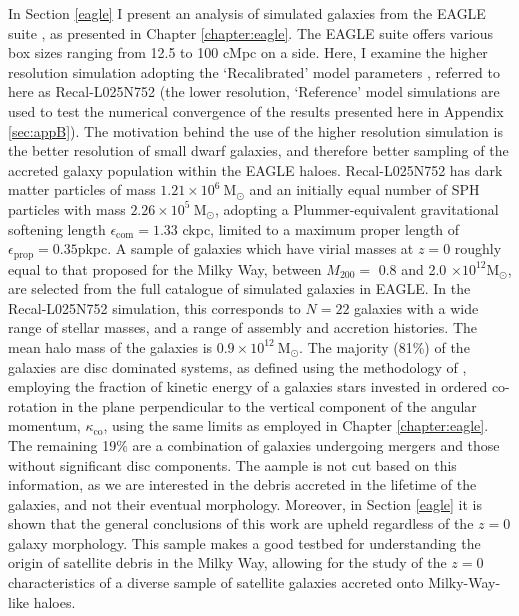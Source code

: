In Section \ref{eagle} I present an analysis of simulated
galaxies from the EAGLE suite
\citep{2015MNRAS.446..521S,2015MNRAS.450.1937C}, as presented in Chapter \ref{chapter:eagle}.  The EAGLE suite offers various box sizes ranging from 12.5 to 100 cMpc on a side. Here, I examine the higher resolution simulation
adopting the `Recalibrated' model parameters
\citep[see][]{2015MNRAS.446..521S}, referred to here as Recal-L025N752
(the lower resolution, `Reference' model simulations are used to test
the numerical convergence of the results presented here in Appendix \ref{sec:appB}).
The motivation behind the use of the higher resolution simulation
is the better resolution of small dwarf galaxies, and therefore
better sampling of the accreted galaxy population within the EAGLE
haloes. Recal-L025N752 has dark matter particles of mass $1.21\times
10^{6}\ \mathrm{M_{\odot}}$ and an initially equal number of SPH
particles with mass $2.26\times 10^{5}\ \mathrm{M_{\odot}}$, adopting
a Plummer-equivalent gravitational softening length
$\epsilon_\mathrm{com}=1.33$ ckpc, limited to a maximum proper
length of $\epsilon_\mathrm{prop}=0.35$pkpc. A sample of
galaxies which have virial masses at $z=0$ roughly equal
to that proposed for the Milky Way, between $M_{200} = $ 0.8 and
2.0 $ \times 10^{12}\mathrm{M_{\odot}}$, are selected from the full catalogue of simulated galaxies in EAGLE.
In the Recal-L025N752 simulation, this corresponds to $N=22$ galaxies
with a wide range of stellar masses, and a range of assembly and
accretion histories.  The mean halo mass of the galaxies is
$0.9\times10^{12}\ \mathrm{M_\odot}$.  The majority (81\%) of the
galaxies are disc dominated systems, as defined using the methodology
of \citet{2017arXiv170406283C}, employing the fraction of
kinetic energy of a galaxies stars invested in ordered co-rotation
in the plane perpendicular to the vertical component of
the angular momentum, $\kappa_{\mathrm{co}}$, using the same limits as employed in Chapter \ref{chapter:eagle}.
The remaining 19\% are a combination of galaxies undergoing mergers
and those without significant disc components. The aample is not cut based on this information, as we are interested in the debris
accreted in the lifetime of the galaxies, and not their eventual
morphology. Moreover, in Section \ref{eagle} it is shown that
the general conclusions of this work are upheld regardless of the $z=0$ galaxy
morphology.  This sample makes a good testbed for understanding the
origin of satellite debris in the Milky Way, allowing for the study of
the $z=0$ characteristics of a diverse sample of satellite galaxies
accreted onto Milky-Way-like haloes.

